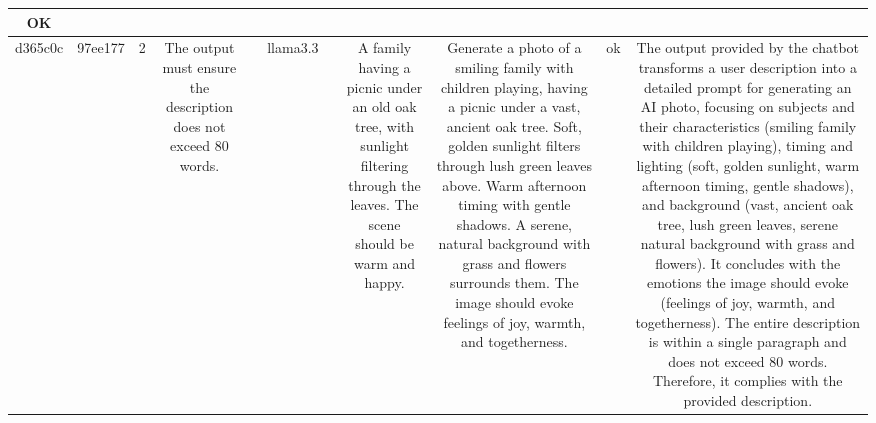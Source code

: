 \begin{table}[h!]
\begin{tabular}{|c|c|c|c|c|c|c|c|c|c|c|}
OK\\
\hline
d365c0c & 97ee177 & 2 & The output must ensure the description does not exceed 80 words. &  & llama3.3 &  & A family having a picnic under an old oak tree, with sunlight filtering through the leaves. The scene should be warm and happy. & Generate a photo of a smiling family with children playing, having a picnic under a vast, ancient oak tree. Soft, golden sunlight filters through lush green leaves above. Warm afternoon timing with gentle shadows. A serene, natural background with grass and flowers surrounds them. The image should evoke feelings of joy, warmth, and togetherness. & ok & The output provided by the chatbot transforms a user description into a detailed prompt for generating an AI photo, focusing on subjects and their characteristics (smiling family with children playing), timing and lighting (soft, golden sunlight, warm afternoon timing, gentle shadows), and background (vast, ancient oak tree, lush green leaves, serene natural background with grass and flowers). It concludes with the emotions the image should evoke (feelings of joy, warmth, and togetherness). The entire description is within a single paragraph and does not exceed 80 words. Therefore, it complies with the provided description.


\end{tabular}
\end{table}
